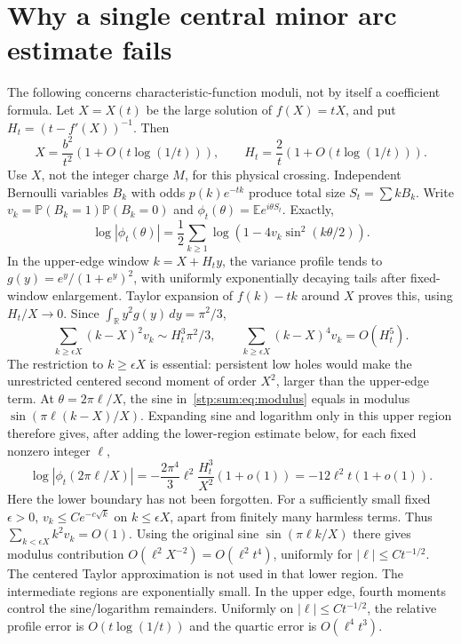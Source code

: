 \documentclass[11pt]{article}
\theoremstyle{remark}\newtheorem{remark}[theorem]{Remark}
\newcommand{\E}{\mathbb E}
\newcommand{\Prob}{\mathbb P}
\begin{document}
\section{Why a single central minor arc estimate fails}
\label{stp:sum:sec:resonance}
The following concerns characteristic-function moduli, not by itself a coefficient formula. Let $X=X(t)$ be the large solution of $f(X)=tX$, and put $H_t=(t-f'(X))^{-1}$. Then
\begin{equation}\label{stp:sum:eq:XHt}
 X=\frac{b^2}{t^2}(1+O(t\log(1/t))),\qquad
 H_t=\frac2t(1+O(t\log(1/t))).
\end{equation}
Use $X$, not the integer charge $M$, for this physical crossing. Independent Bernoulli variables $B_k$ with odds $p(k)e^{-tk}$ produce total size $S_t=\sum kB_k$. Write $v_k=\Prob(B_k=1)\Prob(B_k=0)$ and $\phi_t(\theta)=\E e^{i\theta S_t}$. Exactly,
\begin{equation}\label{stp:sum:eq:modulus}
 \log|\phi_t(\theta)|=\frac12\sum_{k\ge1}
 \log\left(1-4v_k\sin^2(k\theta/2)\right).
\end{equation}
In the upper-edge window $k=X+H_ty$, the variance profile tends to
$g(y)=e^y/(1+e^y)^2$, with uniformly exponentially decaying tails after fixed-window enlargement. Taylor expansion of $f(k)-tk$ around $X$ proves this, using $H_t/X\to0$. Since $\int_{\mathbb R}y^2g(y)\,dy=\pi^2/3$,
\[
 \sum_{k\ge\epsilon X}(k-X)^2v_k\sim H_t^3\pi^2/3,\qquad
 \sum_{k\ge\epsilon X}(k-X)^4v_k=O(H_t^5).
\]
The restriction to $k\ge\epsilon X$ is essential: persistent low holes would make the unrestricted centered second moment of order $X^2$, larger than the upper-edge term. At $\theta=2\pi\ell/X$, the sine in~\eqref{stp:sum:eq:modulus} equals in modulus $\sin(\pi\ell(k-X)/X)$. Expanding sine and logarithm only in this upper region therefore gives, after adding the lower-region estimate below, for each fixed nonzero integer $\ell$,
\begin{equation}\label{stp:sum:eq:resonance}
 \log|\phi_t(2\pi\ell/X)|
 =-\frac{2\pi^4}{3}\ell^2\frac{H_t^3}{X^2}(1+o(1))
 =-12\ell^2t(1+o(1)).
\end{equation}
Here the lower boundary has not been forgotten. For a sufficiently small fixed $\epsilon>0$, $v_k\le Ce^{-c\sqrt k}$ on $k\le\epsilon X$, apart from finitely many harmless terms. Thus $\sum_{k<\epsilon X} k^2v_k=O(1)$. Using the original sine $\sin(\pi\ell k/X)$ there gives modulus contribution $O(\ell^2X^{-2})=O(\ell^2t^4)$, uniformly for $|\ell|\le Ct^{-1/2}$. The centered Taylor approximation is not used in that lower region. The intermediate regions are exponentially small. In the upper edge, fourth moments control the sine/logarithm remainders. Uniformly on $|\ell|\le C t^{-1/2}$, the relative profile error is $O(t\log(1/t))$ and the quartic error is $O(\ell^4t^3)$.
\end{document}
